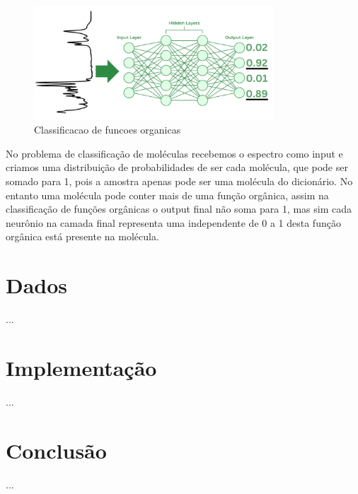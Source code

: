\documentclass[11pt,a4paper]{article}
\begin{document}
\begin{figure}[h]
    \centering
    \includegraphics[width=0.8\textwidth]{Images/N2.png}
    \caption{Classificacao de funcoes organicas}
    \label{fig:ir_spectrum}
\end{figure}


No problema de classificação  de moléculas recebemos o espectro como input e criamos uma distribuição de probabilidades de ser cada molécula, que pode ser somado para 1, pois a amostra apenas pode ser uma molécula do dicionário. No entanto uma molécula pode conter mais de uma função orgânica, assim na classificação de funções orgânicas  o output final não soma para 1, mas sim cada neurônio na camada final representa uma  independente de 0 a 1 desta função orgânica está presente na molécula. 


\section{Dados}

...


\section{Implementação}
...

\section{Conclusão}
...



% 
% 
\end{document}
